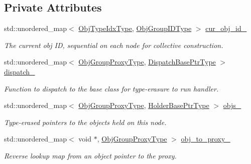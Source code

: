 \subsection*{Private Attributes}
\begin{DoxyCompactItemize}
\item 
std\+::unordered\+\_\+map$<$ \hyperlink{namespacevt_1_1objgroup_a378e4b966221779c74f3a2f921eb2421}{Obj\+Type\+Idx\+Type}, \hyperlink{namespacevt_1_1objgroup_a54a50ff6833bf618e5bedb9a3b6d0e07}{Obj\+Group\+I\+D\+Type} $>$ \hyperlink{structvt_1_1objgroup_1_1_obj_group_manager_a0e99df8712ce2d9e21404955ec312cf8}{cur\+\_\+obj\+\_\+id\+\_\+}
\begin{DoxyCompactList}\small\item\em The current obj ID, sequential on each node for collective construction. \end{DoxyCompactList}\item 
std\+::unordered\+\_\+map$<$ \hyperlink{namespacevt_ad7cae989df485fccca57f0792a880a8e}{Obj\+Group\+Proxy\+Type}, \hyperlink{structvt_1_1objgroup_1_1_obj_group_manager_a8f2ded4cfa63faa119c2bd550764878f}{Dispatch\+Base\+Ptr\+Type} $>$ \hyperlink{structvt_1_1objgroup_1_1_obj_group_manager_af0a909e8963f651ba854ef6199612960}{dispatch\+\_\+}
\begin{DoxyCompactList}\small\item\em Function to dispatch to the base class for type-\/erasure to run handler. \end{DoxyCompactList}\item 
std\+::unordered\+\_\+map$<$ \hyperlink{namespacevt_ad7cae989df485fccca57f0792a880a8e}{Obj\+Group\+Proxy\+Type}, \hyperlink{structvt_1_1objgroup_1_1_obj_group_manager_ac1e9bb19d4a5923dd6d595bad28f04c9}{Holder\+Base\+Ptr\+Type} $>$ \hyperlink{structvt_1_1objgroup_1_1_obj_group_manager_a7d061065440ad2a2379b85b94705fa36}{objs\+\_\+}
\begin{DoxyCompactList}\small\item\em Type-\/erased pointers to the objects held on this node. \end{DoxyCompactList}\item 
std\+::unordered\+\_\+map$<$ void $\ast$, \hyperlink{namespacevt_ad7cae989df485fccca57f0792a880a8e}{Obj\+Group\+Proxy\+Type} $>$ \hyperlink{structvt_1_1objgroup_1_1_obj_group_manager_a3c305145bf02f4f7add709186a40695a}{obj\+\_\+to\+\_\+proxy\+\_\+}
\begin{DoxyCompactList}\small\item\em Reverse lookup map from an object pointer to the proxy. \end{DoxyCompactList}\item 

\end{DoxyCompactItemize}
